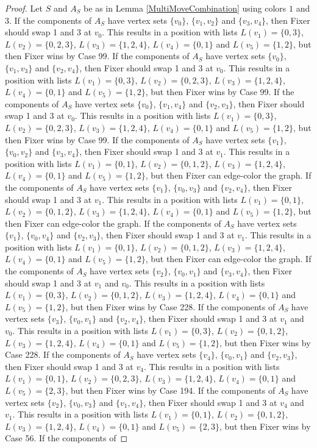 \documentclass[12pt]{amsart}
\theoremstyle{plain}
\theoremstyle{definition}
\theoremstyle{remark}
\begin{document}
\begin{proof}
Let $S$ and $A_S$ be as in Lemma \ref{MultiMoveCombination} using colors $1$ and $3$. If the components of $A_S$ have vertex sets $\{v_0\}$, $\{v_1, v_2\}$ and $\{v_3, v_4\}$, then Fixer should swap 1 and 3 at $v_0$. This results in a position with lists $L(v_1) = \{0, 3\}$, $L(v_2) = \{0, 2, 3\}$, $L(v_3) = \{1, 2, 4\}$, $L(v_4) = \{0, 1\}$ and $L(v_5) = \{1, 2\}$, but then Fixer wins by Case 99. If the components of $A_S$ have vertex sets $\{v_0\}$, $\{v_1, v_3\}$ and $\{v_2, v_4\}$, then Fixer should swap 1 and 3 at $v_0$. This results in a position with lists $L(v_1) = \{0, 3\}$, $L(v_2) = \{0, 2, 3\}$, $L(v_3) = \{1, 2, 4\}$, $L(v_4) = \{0, 1\}$ and $L(v_5) = \{1, 2\}$, but then Fixer wins by Case 99. If the components of $A_S$ have vertex sets $\{v_0\}$, $\{v_1, v_4\}$ and $\{v_2, v_3\}$, then Fixer should swap 1 and 3 at $v_0$. This results in a position with lists $L(v_1) = \{0, 3\}$, $L(v_2) = \{0, 2, 3\}$, $L(v_3) = \{1, 2, 4\}$, $L(v_4) = \{0, 1\}$ and $L(v_5) = \{1, 2\}$, but then Fixer wins by Case 99. If the components of $A_S$ have vertex sets $\{v_1\}$, $\{v_0, v_2\}$ and $\{v_3, v_4\}$, then Fixer should swap 1 and 3 at $v_1$. This results in a position with lists $L(v_1) = \{0, 1\}$, $L(v_2) = \{0, 1, 2\}$, $L(v_3) = \{1, 2, 4\}$, $L(v_4) = \{0, 1\}$ and $L(v_5) = \{1, 2\}$, but then Fixer can edge-color the graph. If the components of $A_S$ have vertex sets $\{v_1\}$, $\{v_0, v_3\}$ and $\{v_2, v_4\}$, then Fixer should swap 1 and 3 at $v_1$. This results in a position with lists $L(v_1) = \{0, 1\}$, $L(v_2) = \{0, 1, 2\}$, $L(v_3) = \{1, 2, 4\}$, $L(v_4) = \{0, 1\}$ and $L(v_5) = \{1, 2\}$, but then Fixer can edge-color the graph. If the components of $A_S$ have vertex sets $\{v_1\}$, $\{v_0, v_4\}$ and $\{v_2, v_3\}$, then Fixer should swap 1 and 3 at $v_1$. This results in a position with lists $L(v_1) = \{0, 1\}$, $L(v_2) = \{0, 1, 2\}$, $L(v_3) = \{1, 2, 4\}$, $L(v_4) = \{0, 1\}$ and $L(v_5) = \{1, 2\}$, but then Fixer can edge-color the graph. If the components of $A_S$ have vertex sets $\{v_2\}$, $\{v_0, v_1\}$ and $\{v_3, v_4\}$, then Fixer should swap 1 and 3 at $v_1$ and $v_0$. This results in a position with lists $L(v_1) = \{0, 3\}$, $L(v_2) = \{0, 1, 2\}$, $L(v_3) = \{1, 2, 4\}$, $L(v_4) = \{0, 1\}$ and $L(v_5) = \{1, 2\}$, but then Fixer wins by Case 228. If the components of $A_S$ have vertex sets $\{v_3\}$, $\{v_0, v_1\}$ and $\{v_2, v_4\}$, then Fixer should swap 1 and 3 at $v_1$ and $v_0$. This results in a position with lists $L(v_1) = \{0, 3\}$, $L(v_2) = \{0, 1, 2\}$, $L(v_3) = \{1, 2, 4\}$, $L(v_4) = \{0, 1\}$ and $L(v_5) = \{1, 2\}$, but then Fixer wins by Case 228. If the components of $A_S$ have vertex sets $\{v_4\}$, $\{v_0, v_1\}$ and $\{v_2, v_3\}$, then Fixer should swap 1 and 3 at $v_4$. This results in a position with lists $L(v_1) = \{0, 1\}$, $L(v_2) = \{0, 2, 3\}$, $L(v_3) = \{1, 2, 4\}$, $L(v_4) = \{0, 1\}$ and $L(v_5) = \{2, 3\}$, but then Fixer wins by Case 194. If the components of $A_S$ have vertex sets $\{v_2\}$, $\{v_0, v_3\}$ and $\{v_1, v_4\}$, then Fixer should swap 1 and 3 at $v_4$ and $v_1$. This results in a position with lists $L(v_1) = \{0, 1\}$, $L(v_2) = \{0, 1, 2\}$, $L(v_3) = \{1, 2, 4\}$, $L(v_4) = \{0, 1\}$ and $L(v_5) = \{2, 3\}$, but then Fixer wins by Case 56. If the components of 
\end{proof}
\end{document}
